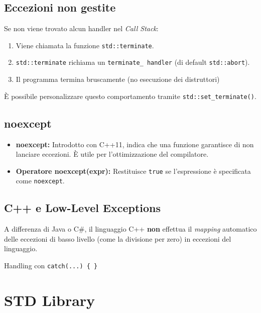 \subsection{Eccezioni non gestite}
Se non viene trovato alcun handler nel \textit{Call Stack}:


\begin{enumerate}
    \item Viene chiamata la funzione \texttt{std::terminate}.
    \item \texttt{std::terminate} richiama un \texttt{terminate\_ handler} (di default \texttt{std::abort}).
    \item Il programma termina bruscamente (no esecuzione dei distruttori)
\end{enumerate}\smallbreak

È possibile personalizzare questo comportamento tramite \texttt{std::set\_terminate()}.

\subsection{noexcept}
\begin{itemize}
    \item \textbf{noexcept:} Introdotto con C++11, indica che una funzione garantisce di non lanciare eccezioni. È utile per l'ottimizzazione del compilatore.
    \item \textbf{Operatore noexcept(expr):}  Restituisce \texttt{true} se l'espressione è specificata come \texttt{noexcept}.
\end{itemize}

\vspace{-1em}

\subsection{C++ e Low-Level Exceptions}
A differenza di Java o C\#, il linguaggio C++ \textbf{non} effettua il \textit{mapping}
automatico delle eccezioni di basso livello (come la divisione per zero) in eccezioni 
del linguaggio.
\smallskip

Handling con \texttt{catch(...) \{ \}} 

\section{STD Library}
